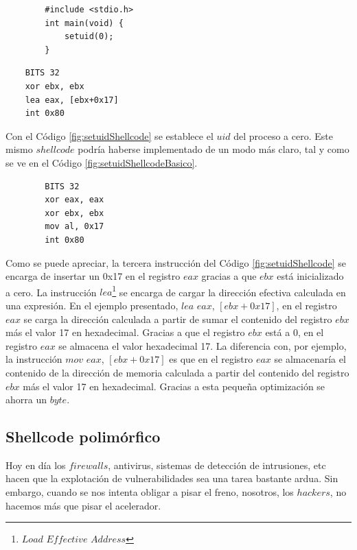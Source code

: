 \documentclass [titlepage, 12pt]{article}
\begin{document}
\lstset{language=C++,caption=Funci\'on $setuid$ en C,label=fig:setuidC}
\begin{lstlisting}			
		#include <stdio.h>
		int main(void) {
			setuid(0);
		}
\end{lstlisting}

\lstset{language=[x86masm]Assembler,caption=Funci\'on $setuid$ en ensamblador,label=fig:setuidShellcode}
\begin{lstlisting}			
	BITS 32
	xor ebx, ebx
	lea eax, [ebx+0x17]
	int 0x80
\end{lstlisting}

Con el C\'odigo \ref{fig:setuidShellcode} se establece el $uid$ del proceso a cero. Este mismo $shellcode$ podr\'ia haberse implementado de un modo m\'as claro, tal y como se ve en el C\'odigo \ref{fig:setuidShellcodeBasico}.

\lstset{language=[x86masm]Assembler,caption=Funci\'on $setuid$ en ensamblador sin optimizar,label=fig:setuidShellcodeBasico}
\begin{lstlisting}				
		BITS 32
		xor eax, eax
		xor ebx, ebx
		mov al, 0x17
		int 0x80
\end{lstlisting}

Como se puede apreciar, la tercera instrucci\'on del C\'odigo \ref{fig:setuidShellcode} se encarga de insertar un 0x17 en el registro $eax$ gracias a que $ebx$ est\'a inicializado a cero. La instrucci\'on $lea$\footnote{$Load$ $Effective$ $Address$} se encarga de cargar la direcci\'on efectiva calculada en una expresi\'on. En el ejemplo presentado, $lea$ $eax$, $[ebx+0x17]$, en el registro $eax$ se carga la direcci\'on calculada a partir de sumar el contenido del registro $ebx$ m\'as el valor 17 en hexadecimal. Gracias a que el registro $ebx$ est\'a a 0, en el registro $eax$ se almacena el valor hexadecimal 17. La diferencia con, por ejemplo, la instrucci\'on $mov$ $eax$, $[ebx+0x17]$ es que en el registro $eax$ se almacenar\'ia el contenido de la direcci\'on de memoria calculada a partir del contenido del registro $ebx$ m\'as el valor 17 en hexadecimal. Gracias a esta peque\~na optimizaci\'on se ahorra un $byte$.

\subsection{Shellcode polim\'orfico}
Hoy en d\'ia los $firewalls$, antivirus, sistemas de detecci\'on de intrusiones, etc hacen que la explotaci\'on de vulnerabilidades sea una tarea bastante ardua. Sin embargo, cuando se nos intenta obligar a pisar el freno, nosotros, los $hackers$, no hacemos m\'as que pisar el acelerador.\bigskip
\end{document}
